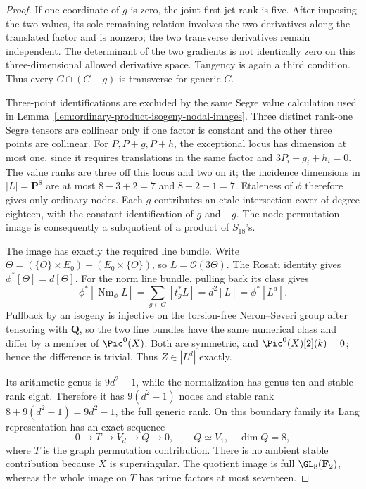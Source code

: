 \begin{proof}
If one coordinate of $g$ is zero, the joint first-jet rank is five.
After imposing the two values, its sole remaining relation involves
the two derivatives along the translated factor and is nonzero;
the two transverse derivatives remain independent. The determinant
of the two gradients is not identically zero on this three-dimensional
allowed derivative space. Tangency is again a third condition.
Thus every $C\cap(C-g)$ is transverse for generic $C$.

Three-point identifications are excluded by the same Segre value
calculation used in Lemma~\ref{lem:ordinary-product-isogeny-nodal-images}.
Three distinct rank-one Segre tensors are collinear only if one factor
is constant and the other three points are collinear. For
$P,P+g,P+h$, the exceptional locus has dimension at most one, since
it requires translations in the same factor and
$3P_i+g_i+h_i=0$. The value ranks are three off this locus and two
on it; the incidence dimensions in $|L|=\mathbf P^8$ are at most
$8-3+2=7$ and $8-2+1=7$. Etaleness of $\phi$ therefore gives only
ordinary nodes. Each $g$ contributes an etale intersection cover of
degree eighteen, with the constant identification of $g$ and $-g$.
The node permutation image is consequently a subquotient of a
product of $S_{18}$'s.

The image has exactly the required line bundle. Write
$\Theta=(\{O\}\times E_0)+(E_0\times\{O\})$, so $L=\mathcal O(3\Theta)$.
The Rosati identity gives $\phi^*[\Theta]=d[\Theta]$.
For the norm line bundle, pulling back its class gives
\[
 \phi^*[\operatorname{Nm}_\phi L]
   =\sum_{g\in G}[t_g^*L]=d^2[L]=\phi^*[L^d].
\]
Pullback by an isogeny is injective on the torsion-free Neron--Severi
group after tensoring with $\mathbf Q$, so the two line bundles
have the same numerical class and differ by a member of $\Pic^0(X)$.
Both are symmetric, and $\Pic^0(X)[2](k)=0$; hence the difference
is trivial. Thus $Z\in|L^d|$ exactly.

Its arithmetic genus is $9d^2+1$, while the normalization has
genus ten and stable rank eight. Therefore it has $9(d^2-1)$
nodes and stable rank $8+9(d^2-1)=9d^2-1$, the full generic rank.
On this boundary family its Lang representation has an exact sequence
\[
                  0\longrightarrow T\longrightarrow V_d
                    \longrightarrow Q\longrightarrow0,
 \qquad Q\simeq V_1,\quad \dim Q=8,
\]
where $T$ is the graph permutation contribution. There is no ambient
stable contribution because $X$ is supersingular.
The quotient image is full $\GL_8(\mathbf F_2)$, whereas the whole
image on $T$ has prime factors at most seventeen.


\end{proof}
